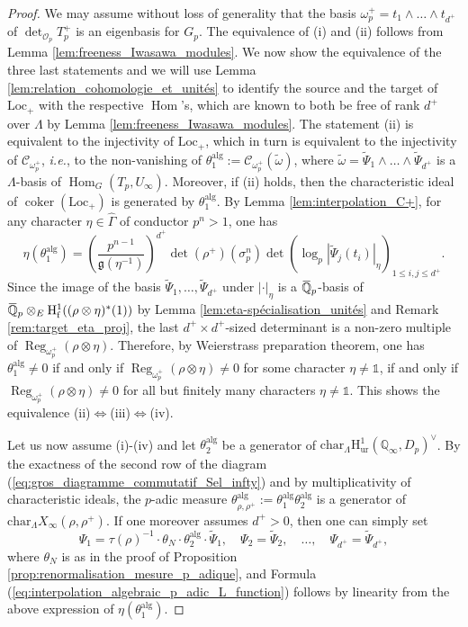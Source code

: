 \documentclass[12pt]{amsart}
\newcommand\bQ{\mathbb{Q}}
\newcommand\cO{\mathcal{O}}
\newcommand\g{\mathfrak{g}}
\newcommand\sC{\mathscr{C}}
\newcommand{\ob}[1]{\mkern 1.5mu\overline{\mkern-1.5mu#1\mkern-1.5mu}\mkern 1.5mu}
\newcommand{\Loc}{\mathrm{Loc}}
\newcommand{\alg}{\textrm{alg}}
\renewcommand{\char}{\textrm{char}}
\DeclareMathOperator{\Hom}{Hom}
\DeclareMathOperator{\coker}{coker}
\DeclareMathOperator{\Reg}{Reg}
\newcommand{\HH}{\mathrm{H}}
\newcommand{\ff}{\mathrm{f}}
\newcommand{\ur}{\mathrm{ur}}
\theoremstyle{defstyle}
\theoremstyle{thmstyle}
\begin{document}
\begin{proof}
	We may assume without loss of generality that the basis $\omega_p^+=t_1\wedge\ldots\wedge t_{d^+}$ of $\det_{\cO_p}T_p^+$ is an eigenbasis for $G_p$. The equivalence of (i) and (ii) follows from Lemma \ref{lem:freeness_Iwasawa_modules}. We now show the equivalence of the three last statements and we will use Lemma \ref{lem:relation_cohomologie_et_unités} to identify the source and the target of $\Loc_+$ with the respective $\Hom$'s, which are known to both be free of rank $d^+$ over $\Lambda$ by Lemma \ref{lem:freeness_Iwasawa_modules}. The statement (ii) is equivalent to the injectivity of $\Loc_+$, which in turn is equivalent to the injectivity of $\sC_{\omega_p^+}$, \textit{i.e.}, to the non-vanishing of $\theta_1^\alg:=\sC_{\omega_p^+}(\widetilde{\omega})$, where $\widetilde{\omega}=\tilde{\Psi}_1\wedge\ldots\wedge\tilde{\Psi}_{d^+}$ is a $\Lambda$-basis of $\Hom_G(T_p,U_\infty)$. Moreover, if (ii) holds, then the characteristic ideal of $\coker(\Loc_+)$ is generated by $\theta_1^\alg$. By Lemma \ref{lem:interpolation_C+}, for any character $\eta\in\widehat{\Gamma}$ of conductor $p^n>1$, one has 
\begin{equation*}
\eta(\theta_1^\alg) =\left(\frac{p^{n-1}}{\g(\eta^{-1})}\right)^{d^+}\det (\rho^+)(\sigma_p^n)\det \left(\log_p|\tilde{\Psi}_j(t_i)|_\eta\right)_{1\leq i,j \leq d^+}.
\end{equation*}
Since the image of the basis $\tilde{\Psi}_1,\ldots,\tilde{\Psi}_{d^+}$ under $|\cdot|_\eta$ is a $\ob{\bQ}_p$-basis of $\ob{\bQ}_p \otimes_E \HH^1_\ff((\rho \otimes \eta)^*(1))$ by Lemma \ref{lem:eta-spécialisation_unités} and Remark \ref{rem:target_eta_proj}, the last $d^+ \times d^+$-sized determinant is a non-zero multiple of $\Reg_{\omega_p^+}(\rho \otimes \eta)$. Therefore, by Weierstrass preparation theorem, one has $\theta_1^\alg \neq 0$ if and only if $\Reg_{\omega_p^+}(\rho \otimes \eta)\neq0$ for some character $\eta\neq \mathds{1}$, if and only if $\Reg_{\omega_p^+}(\rho \otimes \eta)\neq 0$ for all but finitely many characters $\eta\neq \mathds{1}$. This shows the equivalence (ii)$\Leftrightarrow $(iii)$\Leftrightarrow$(iv).

Let us now assume (i)-(iv) and let $\theta_2^\alg$ be a generator of $\char_\Lambda \HH^1_\ur(\bQ_\infty,D_p)^\vee$. By the exactness of the second row of the diagram (\ref{eq:gros_diagramme_commutatif_Sel_infty}) and by multiplicativity of characteristic ideals, the $p$-adic measure $\theta^\alg_{\rho,\rho^+}:=\theta^\alg_{1}\theta^\alg_{2}$ is a generator of $\char_\Lambda X_\infty(\rho,\rho^+)$. If one moreover assumes $d^+>0$, then one can simply set 
$$\Psi_1=\tau(\rho)^{-1}\cdot\theta_N\cdot\theta^\alg_{2}\cdot \tilde{\Psi}_1,\quad \Psi_2=\tilde{\Psi}_2,\quad \ldots,\quad \Psi_{d^+}=\tilde{\Psi}_{d^+},$$ 
where $\theta_N$ is as in the proof of Proposition \ref{prop:renormalisation_mesure_p_adique}, and Formula (\ref{eq:interpolation_algebraic_p_adic_L_function})
follows by linearity from the above expression of $\eta(\theta_1^\alg)$.
 \end{proof}
\end{document}
